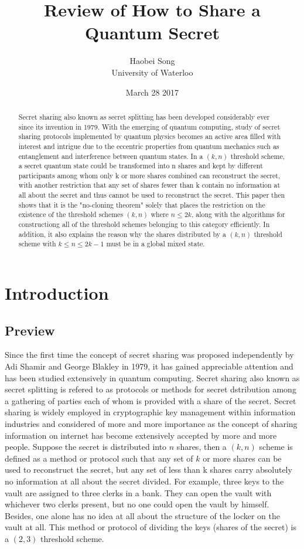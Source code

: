 \documentclass[12pt]{article}
\title{\textbf{Review of How to Share a Quantum Secret \cite{review}}}
\author{Haobei Song\\University of Waterloo}
\date{March 28 2017}
\begin{document}
\maketitle
\newpage


\begin{abstract}
	Secret sharing also known as secret splitting has been developed considerably ever since its invention in 1979. With the emerging of quantum computing, study of secret sharing protocols implemented by quantum physics becomes an active area filled with interest and intrigue due to the eccentric properties from quantum mechanics such as entanglement and interference between quantum states.
	In a $(k,n)$ threshold scheme, a secret quantum state could be transformed into n shares and kept by different participants among whom only k or more shares combined can reconstruct the secret, with another restriction that any set of shares fewer than k contain no information at all about the secret and thus cannot be used to reconstruct the secret.
	This paper then shows that it is the "no-cloning theorem" solely that places the restriction on the existence of the threshold schemes $(k, n)$ where $n \le 2k$, along with the algorithms for constructiong all of the threshold schemes belonging to this category efficiently. In addition, it also explains the reason why the shares distributed by a $(k,n)$ threshold scheme with $k \leq n \le 2k-1$ must be in a global mixed state.
	

\end{abstract}
\section{Introduction}
\subsection{Preview}
Since the first time the concept of secret sharing was proposed independently by Adi Shamir\cite{Shamir} and George Blakley\cite{Blakley} in 1979, it has gained appreciable attention and has been studied extensively in quantum computing.
	Secret sharing also known as secret splitting is refered to as protocols or methods for secret dstribution among a gathering of parties each of whom is provided with a share of the secret. 
	Secret sharing is widely employed in cryptographic key management within information industries and considered of more and more importance as the concept of sharing information on internet has become extensively accepted by more and more people.
	Suppose the secret is distributed into $n$ shares, then a $(k,n)$ scheme is defined as a method or protocol such that any set of $k$ or more shares can be used to reconstruct the secret, but any set of less than k shares carry absolutely no information at all about the secret divided. 
	For example, three keys to the vault are assigned to three clerks in a bank. 
	They can open the vault with whichever two clerks present, but no one could open the vault by himself. 
	Besides, one alone has no idea at all about the structure of the locker on the vault at all. 
	This method or protocol of dividing the keys (shares of the secret) is a $(2,3)$ threshold scheme.
	\\
\end{document}
